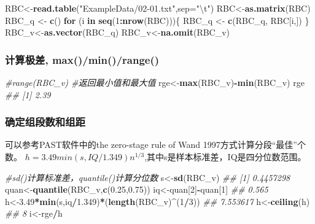 \documentclass[
]{article}
\newenvironment{Shaded}{\begin{snugshade}}{\end{snugshade}}
\newcommand{\CharTok}[1]{\textcolor[rgb]{0.31,0.60,0.02}{#1}}
\newcommand{\CommentTok}[1]{\textcolor[rgb]{0.56,0.35,0.01}{\textit{#1}}}
\newcommand{\ControlFlowTok}[1]{\textcolor[rgb]{0.13,0.29,0.53}{\textbf{#1}}}
\newcommand{\DataTypeTok}[1]{\textcolor[rgb]{0.13,0.29,0.53}{#1}}
\newcommand{\DecValTok}[1]{\textcolor[rgb]{0.00,0.00,0.81}{#1}}
\newcommand{\FloatTok}[1]{\textcolor[rgb]{0.00,0.00,0.81}{#1}}
\newcommand{\KeywordTok}[1]{\textcolor[rgb]{0.13,0.29,0.53}{\textbf{#1}}}
\newcommand{\NormalTok}[1]{#1}
\newcommand{\OperatorTok}[1]{\textcolor[rgb]{0.81,0.36,0.00}{\textbf{#1}}}
\newcommand{\StringTok}[1]{\textcolor[rgb]{0.31,0.60,0.02}{#1}}
\begin{document}
\begin{Shaded}
\begin{Highlighting}[]
\NormalTok{RBC<-}\KeywordTok{read.table}\NormalTok{(}\StringTok{"ExampleData/02-01.txt"}\NormalTok{,}\DataTypeTok{sep=}\StringTok{"}\CharTok{\textbackslash{}t}\StringTok{"}\NormalTok{)}
\NormalTok{RBC<-}\KeywordTok{as.matrix}\NormalTok{(RBC)}
\NormalTok{RBC_q <-}\StringTok{ }\KeywordTok{c}\NormalTok{()}
\ControlFlowTok{for}\NormalTok{ (i }\ControlFlowTok{in} \KeywordTok{seq}\NormalTok{(}\DecValTok{1}\OperatorTok{:}\KeywordTok{nrow}\NormalTok{(RBC)))\{}
\NormalTok{  RBC_q <-}\StringTok{ }\KeywordTok{c}\NormalTok{(RBC_q, RBC[i,])}
\NormalTok{\}}
\NormalTok{RBC_v<-}\KeywordTok{as.vector}\NormalTok{(RBC_q)}
\NormalTok{RBC_v<-}\KeywordTok{na.omit}\NormalTok{(RBC_v)}
\end{Highlighting}
\end{Shaded}

\hypertarget{ux8ba1ux7b97ux6781ux5dee-maxminrange}{%
\subsubsection{计算极差, max()/min()/range()}\label{ux8ba1ux7b97ux6781ux5dee-maxminrange}}

\begin{Shaded}
\begin{Highlighting}[]
\CommentTok{#range(RBC_v)  #返回最小值和最大值}
\NormalTok{rge<-}\KeywordTok{max}\NormalTok{(RBC_v)}\OperatorTok{-}\KeywordTok{min}\NormalTok{(RBC_v)}
\NormalTok{rge}
\CommentTok{## [1] 2.39}
\end{Highlighting}
\end{Shaded}

\hypertarget{ux786eux5b9aux7ec4ux6bb5ux6570ux548cux7ec4ux8ddd}{%
\subsubsection{确定组段数和组距}\label{ux786eux5b9aux7ec4ux6bb5ux6570ux548cux7ec4ux8ddd}}

可以参考PAST软件中的the zero-stage rule of Wand 1997方式计算分段``最佳''个数。
\(h=3.49min(s,IQ/1.349)n^{1/3}\),其中s是样本标准差，IQ是四分位数范围。

\begin{Shaded}
\begin{Highlighting}[]
\CommentTok{#sd()计算标准差，quantile()计算分位数}
\NormalTok{s<-}\KeywordTok{sd}\NormalTok{(RBC_v)}
\CommentTok{## [1] 0.4457298}
\NormalTok{quan<-}\KeywordTok{quantile}\NormalTok{(RBC_v,}\KeywordTok{c}\NormalTok{(}\FloatTok{0.25}\NormalTok{,}\FloatTok{0.75}\NormalTok{))}
\NormalTok{iq<-quan[}\DecValTok{2}\NormalTok{]}\OperatorTok{-}\NormalTok{quan[}\DecValTok{1}\NormalTok{]}
\CommentTok{## 0.565}
\NormalTok{h<-}\FloatTok{3.49}\OperatorTok{*}\KeywordTok{min}\NormalTok{(s,iq}\OperatorTok{/}\FloatTok{1.349}\NormalTok{)}\OperatorTok{*}\NormalTok{(}\KeywordTok{length}\NormalTok{(RBC_v)}\OperatorTok{^}\NormalTok{(}\DecValTok{1}\OperatorTok{/}\DecValTok{3}\NormalTok{))}
\CommentTok{## 7.553617}
\NormalTok{h<-}\KeywordTok{ceiling}\NormalTok{(h)}
\CommentTok{## 8}
\NormalTok{i<-rge}\OperatorTok{/}\NormalTok{h}
\end{Highlighting}
\end{Shaded}
\end{document}
